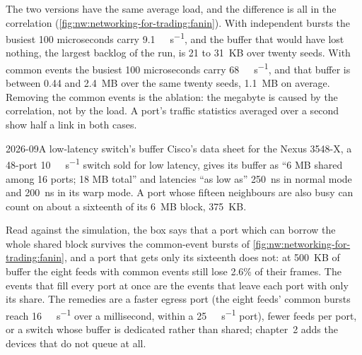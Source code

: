 \begin{omfigure}
\label{fig:nw:networking-for-trading:fanin}
\end{omfigure}

The two versions have the same average load, and the difference is all in the correlation
(\cref{fig:nw:networking-for-trading:fanin}). With independent bursts the busiest 100 microseconds carry
\qty{9.1}{\giga\bit\per\second}, and the buffer that would have lost nothing, the largest backlog of the run, is 21 to 31~KB
over twenty seeds. With common events the busiest 100 microseconds carry \qty{68}{\giga\bit\per\second}, and that buffer is
between 0.44 and 2.4~MB over the same twenty seeds, 1.1~MB on average. Removing the common events is the ablation: the
megabyte is caused by the correlation, not by the load. A port's traffic statistics averaged over a second show half a link in
both cases.

\begin{dated}{2026-09}{A low-latency switch's buffer}\label{dat:nw:networking-for-trading:buffer}
Cisco's data sheet for the Nexus 3548-X, a 48-port \qty{10}{\giga\bit\per\second} switch sold for low latency, gives its
buffer as ``6 MB shared among 16 ports; 18 MB total'' and latencies ``as low as'' \qty{250}{\nano\second} in normal mode and
\qty{200}{\nano\second} in its warp mode. A port whose fifteen neighbours are also busy can count on about a sixteenth of its
6~MB block, 375~KB.
\end{dated}

Read against the simulation, the box says that a port which can borrow the whole shared block survives the common-event
bursts of \cref{fig:nw:networking-for-trading:fanin}, and a port that gets only its sixteenth does not: at 500~KB of buffer the
eight feeds with common events still lose 2.6\% of their frames. The events that fill every port at once are the events that
leave each port with only its share. The remedies are a faster egress port (the eight feeds' common bursts reach
\qty{16}{\giga\bit\per\second} over a millisecond, within a \qty{25}{\giga\bit\per\second} port), fewer feeds per port, or a
switch whose buffer is dedicated rather than shared; chapter~2 adds the devices that do not queue at all.

